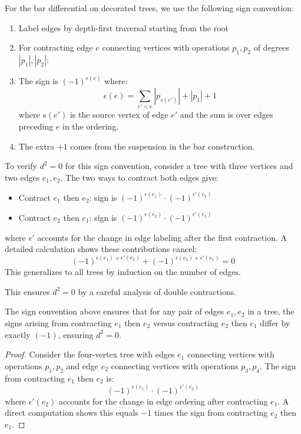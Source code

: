 \begin{convention}
For the bar differential on decorated trees, we use the following sign convention:
\begin{enumerate}
\item Label edges by depth-first traversal starting from the root
\item For contracting edge $e$ connecting vertices with operations $p_1, p_2$ of degrees $|p_1|, |p_2|$:
\item The sign is $(-1)^{\epsilon(e)}$ where:
$$\epsilon(e) = \sum_{e' < e} |p_{s(e')}| + |p_1| + 1$$
where $s(e')$ is the source vertex of edge $e'$ and the sum is over edges preceding $e$ in the ordering.
\item The extra $+1$ comes from the suspension in the bar construction.
\end{enumerate}

To verify $d^2 = 0$ for this sign convention, consider a tree with three vertices and two edges $e_1, e_2$. The two ways to contract both edges give:
\begin{itemize}
\item Contract $e_1$ then $e_2$: sign is $(-1)^{\epsilon(e_1)} \cdot (-1)^{\epsilon'(e_2)}$
\item Contract $e_2$ then $e_1$: sign is $(-1)^{\epsilon(e_2)} \cdot (-1)^{\epsilon'(e_1)}$
\end{itemize}
where $\epsilon'$ accounts for the change in edge labeling after the first contraction. A detailed calculation shows these contributions cancel:
$$(-1)^{\epsilon(e_1) + \epsilon'(e_2)} + (-1)^{\epsilon(e_2) + \epsilon'(e_1)} = 0$$
This generalizes to all trees by induction on the number of edges.

This ensures $d^2 = 0$ by a careful analysis of double contractions.
\end{convention}

\begin{lemma}
The sign convention above ensures that for any pair of edges $e_1, e_2$ in a tree, the signs arising from contracting $e_1$ then $e_2$ versus contracting $e_2$ then $e_1$ differ by exactly $(-1)$, ensuring $d^2 = 0$.
\end{lemma}

\begin{proof}
Consider the four-vertex tree with edges $e_1$ connecting vertices with operations $p_1, p_2$ and edge $e_2$ connecting vertices with operations $p_3, p_4$. The sign from contracting $e_1$ then $e_2$ is:
$$(-1)^{\epsilon(e_1)} \cdot (-1)^{\epsilon'(e_2)}$$
where $\epsilon'(e_2)$ accounts for the change in edge ordering after contracting $e_1$. A direct computation shows this equals $-1$ times the sign from contracting $e_2$ then $e_1$.
\end{proof}


